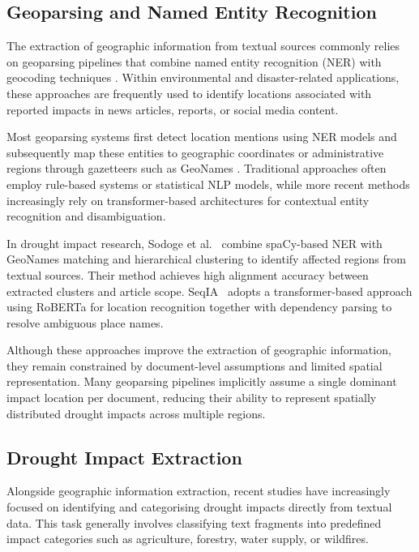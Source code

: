 \subsection{Geoparsing and Named Entity Recognition}

The extraction of geographic information from textual sources commonly relies on geoparsing pipelines that combine named entity recognition (NER) with geocoding techniques \cite{Gritta2018, Karimzadeh2019Geoparsing}. Within environmental and disaster-related applications, these approaches are frequently used to identify locations associated with reported impacts in news articles, reports, or social media content.

Most geoparsing systems first detect location mentions using NER models and subsequently map these entities to geographic coordinates or administrative regions through gazetteers such as GeoNames \cite{Gritta2018}. Traditional approaches often employ rule-based systems or statistical NLP models, while more recent methods increasingly rely on transformer-based architectures for contextual entity recognition and disambiguation.

In drought impact research, Sodoge et al.~\cite{sodoge2023} combine spaCy-based NER with GeoNames matching and hierarchical clustering to identify affected regions from textual sources. Their method achieves high alignment accuracy between extracted clusters and article scope. SeqIA~\cite{lopez2025} adopts a transformer-based approach using RoBERTa for location recognition together with dependency parsing to resolve ambiguous place names.

Although these approaches improve the extraction of geographic information, they remain constrained by document-level assumptions and limited spatial representation. Many geoparsing pipelines implicitly assume a single dominant impact location per document, reducing their ability to represent spatially distributed drought impacts across multiple regions.

\subsection{Drought Impact Extraction}

Alongside geographic information extraction, recent studies have increasingly focused on identifying and categorising drought impacts directly from textual data. This task generally involves classifying text fragments into predefined impact categories such as agriculture, forestry, water supply, or wildfires.

